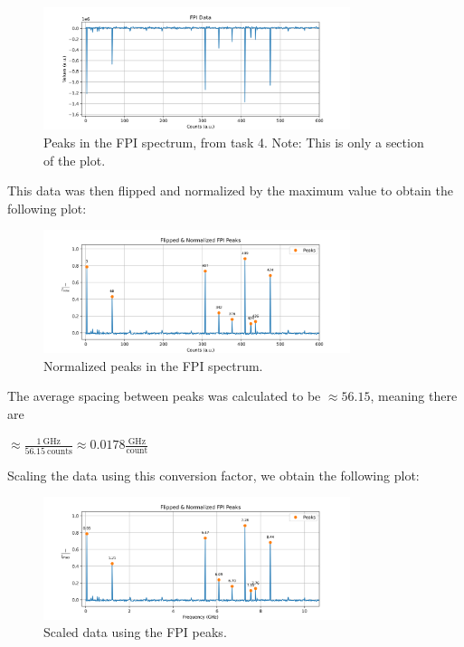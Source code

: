 \documentclass{article}
\begin{document}
\begin{figure}[h]
	\centering
	\includegraphics[width=0.8\textwidth]{Figures/FPI_Data.png}
	\caption{Peaks in the FPI spectrum, from task 4.  Note: This is only a section of the plot.}
	\label{fig:peaks}
\end{figure}

This data was then flipped and normalized by the maximum value to obtain the following plot:

\begin{figure}[h]
	\centering
	\includegraphics[width=0.8\textwidth]{Figures/FPI_Peaks.png}
	\caption{Normalized peaks in the FPI spectrum.}
	\label{fig:normalized_peaks}
\end{figure}

The average spacing between peaks was calculated to be $\approx 56.15$, meaning there are

$\approx \frac{1 \ \text{GHz}}{56.15 \ \text{counts}} \approx 0.0178 \frac{\text{GHz}}{\text{count}}$ 

Scaling the data using this conversion factor, we obtain the following plot:

\begin{figure}[h]
	\centering
	\includegraphics[width=0.8\textwidth]{Figures/FPI_Peaks_GHz.png}
	\caption{Scaled data using the FPI peaks.}
	\label{fig:scaled_data}
\end{figure}
\end{document}

